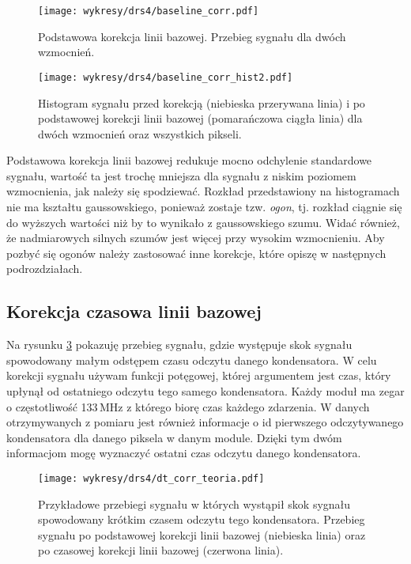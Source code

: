 \documentclass[a4paper,11pt,twoside]{article}
\begin{document}
\begin{figure}[H] 
\centering
\texttt{[image: wykresy/drs4/baseline\_corr.pdf]}
\caption{Podstawowa korekcja linii bazowej. Przebieg sygnału dla dwóch wzmocnień.}
\label{fig:baseline_corr}
\end{figure}

\begin{figure}[H] 
\centering
\texttt{[image: wykresy/drs4/baseline\_corr\_hist2.pdf]}
\caption{Histogram sygnału przed korekcją (niebieska przerywana linia) i po podstawowej korekcji linii bazowej (pomarańczowa ciągła linia) dla dwóch wzmocnień oraz wszystkich pikseli. }
\label{fig:baseline_corr_hist}
\end{figure}
Podstawowa korekcja linii bazowej redukuje mocno odchylenie standardowe sygnału, wartość ta jest trochę mniejsza dla sygnału z niskim poziomem wzmocnienia, jak należy się spodziewać. Rozkład przedstawiony na histogramach nie ma kształtu gaussowskiego, ponieważ zostaje tzw. \textsl{ogon},  tj. rozkład ciągnie się do wyższych wartości niż by to wynikało z gaussowskiego szumu. Widać również, że nadmiarowych silnych szumów jest więcej przy wysokim wzmocnieniu. Aby pozbyć się ogonów należy zastosować inne korekcje, które opiszę w następnych podrozdziałach.

\subsection{Korekcja czasowa linii bazowej}
Na rysunku \ref{fig:dt_corr_Waveform} pokazuję przebieg sygnału, gdzie występuje skok sygnału spowodowany małym odstępem czasu odczytu danego kondensatora. W celu korekcji sygnału używam funkcji potęgowej, której argumentem jest czas, który upłynął od ostatniego odczytu tego samego kondensatora.  Każdy moduł ma zegar o częstotliwość 133\,MHz z którego biorę czas każdego zdarzenia. W danych otrzymywanych z pomiaru jest również informacje o id pierwszego odczytywanego kondensatora dla danego piksela w danym module. Dzięki tym dwóm informacjom mogę wyznaczyć ostatni czas odczytu danego kondensatora. 
\begin{figure}[H] 
\centering
\texttt{[image: wykresy/drs4/dt\_corr\_teoria.pdf]}
\caption{Przykładowe przebiegi sygnału w których wystąpił skok sygnału spowodowany krótkim czasem odczytu tego kondensatora. Przebieg sygnału po podstawowej korekcji linii bazowej (niebieska linia) oraz po czasowej korekcji linii bazowej (czerwona linia).}
\label{fig:dt_corr_Waveform}
\end{figure}
\end{document}
